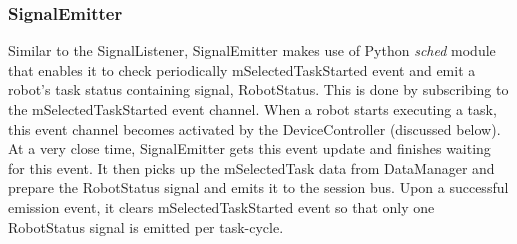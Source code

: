 \subsubsection*{SignalEmitter}
Similar to the SignalListener, SignalEmitter makes use of Python {\em sched} module that enables it to check periodically mSelectedTaskStarted event and emit a robot's task status containing signal, RobotStatus.  This is done by subscribing to the  mSelectedTaskStarted event channel. When a robot starts executing a task, this event channel becomes  activated by the  DeviceController (discussed below). At a very close time, SignalEmitter gets this event update and finishes waiting for this event. It then picks up the mSelectedTask data from DataManager and prepare the RobotStatus signal and emits it to the session bus. Upon a successful emission event, it clears  mSelectedTaskStarted event so that only one RobotStatus  signal is emitted per task-cycle.
